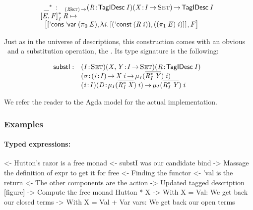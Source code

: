 \[\stk{
\begin{array}{ll}
\FreeIMonad{\_}{} : & _{\PI{\V{I}}{\Set}}
                     \PITEL{\V{R}}{\TagIDesc{\V{I}}} 
                     \PITEL{\V{X}}{\V{I} \To \Set}\To 
                      \TagIDesc{\V{I}}
\end{array} \\
\FreeIMonad{\pair{\V{E}}{\V{F}}{}}{\V{I}}{\V{R}} \mapsto \\ \;\;
    \pair{\pair{\ListCons{\DVar{\!}}{(\fst{\V{E}})}} 
               {\LAM{\V{i}}
                \pair{(\DConst{(\V{R}\: \V{i})})}
                     {((\snd{\V{E}})\: \V{i})}{}}{}}
         {\V{F}}{}
}\]

Just as in the universe of descriptions, this construction comes with
an obvious \return\ and a substitution operation, the \bind. Its type
signature is the following:

\newcommand{\substI}{\F{substI}}

\[
\begin{array}{@{}ll}
\substI : & \PITEL{\V{I}}{\Set}
            \PITEL{\V{X}, \V{Y}}{\V{I} \To \Set}
            \PITEL{\V{R}}{\TagIDesc{\V{I}}} \\
          & \PITEL{\V{\sigma}}{\PI{\V{i}}{\V{I}} \V{X}\:\V{i} \To 
                               \IMu{\V{I}}{(\toIDesc{\FreeIMonad{\V{R}}{\V{I}}{\V{Y}}})}{\V{i}}} \\
          & \PITEL{\V{i}}{\V{I}}
            \PITEL{\V{D}}{\IMu{I}{(\toIDesc{\FreeIMonad{\V{R}}{\V{I}}{\V{X}}})}{\V{i}}} \To
            \IMu{I}{(\toIDesc{\FreeIMonad{\V{R}}{\V{I}}{\V{Y}}})}{\V{i}}
\end{array}
\]

We refer the reader to the Agda model for the actual implementation.

\subsubsection{Examples}

\paragraph{Typed expressions:}

\begin{wstructure}
<- Hutton's razor is a free monad
    <- substI was our candidate bind
        -> Massage the definition of expr to get it for free
    <- Finding the functor
        <- 'val is the return
        <- The other components are the action
        -> Updated tagged description [figure]
    -> Compute the free monad Hutton * X
        -> With X = Val: We get back our closed terms
        -> With X = Val + Var vars: We get back our open terms
\end{wstructure}


